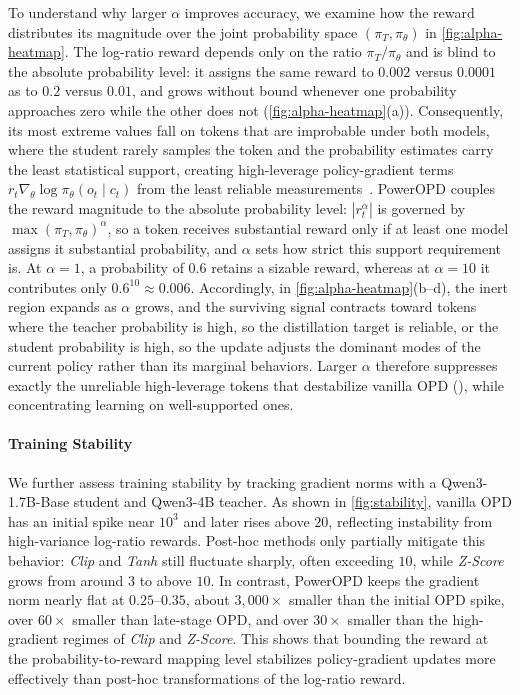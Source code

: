 To understand why larger $\alpha$ improves accuracy, we examine how the reward distributes its magnitude over the joint probability space $(\pi_T, \pi_\theta)$ in \autoref{fig:alpha-heatmap}. The log-ratio reward depends only on the ratio $\pi_T/\pi_\theta$ and is blind to the absolute probability level: it assigns the same reward to $0.002$ versus $0.0001$ as to $0.2$ versus $0.01$, and grows without bound whenever one probability approaches zero while the other does not (\autoref{fig:alpha-heatmap}(a)). Consequently, its most extreme values fall on tokens that are improbable under both models, where the student rarely samples the token and the probability estimates carry the least statistical support, creating high-leverage policy-gradient terms $r_t \nabla_\theta \log \pi_\theta(o_t \mid c_t)$ from the least reliable measurements~\citep{williams1992reinforce, greensmith2004variance}. PowerOPD couples the reward magnitude to the absolute probability level: $|r_t^{\alpha}|$ is governed by $\max(\pi_T, \pi_\theta)^{\alpha}$, so a token receives substantial reward only if at least one model assigns it substantial probability, and $\alpha$ sets how strict this support requirement is. At $\alpha{=}1$, a probability of $0.6$ retains a sizable reward, whereas at $\alpha{=}10$ it contributes only $0.6^{10} \approx 0.006$. Accordingly, in \autoref{fig:alpha-heatmap}(b--d), the inert region expands as $\alpha$ grows, and the surviving signal contracts toward tokens where the teacher probability is high, so the distillation target is reliable, or the student probability is high, so the update adjusts the dominant modes of the current policy rather than its marginal behaviors. Larger $\alpha$ therefore suppresses exactly the unreliable high-leverage tokens that destabilize vanilla OPD (), while concentrating learning on well-supported ones.

\paragraph{Training Stability}
\label{subsec:training-stability}

We further assess training stability by tracking gradient norms with a Qwen3-1.7B-Base student and Qwen3-4B teacher. As shown in \autoref{fig:stability}, vanilla OPD has an initial spike near \(10^3\) and later rises above \(20\), reflecting instability from high-variance log-ratio rewards. Post-hoc methods only partially mitigate this behavior: \emph{Clip} and \emph{Tanh} still fluctuate sharply, often exceeding \(10\), while \emph{Z-Score} grows from around \(3\) to above \(10\). In contrast, PowerOPD keeps the gradient norm nearly flat at \(0.25\)--\(0.35\), about \(3{,}000\times\) smaller than the initial OPD spike, over \(60\times\) smaller than late-stage OPD, and over \(30\times\) smaller than the high-gradient regimes of \emph{Clip} and \emph{Z-Score}. This shows that bounding the reward at the probability-to-reward mapping level stabilizes policy-gradient updates more effectively than post-hoc transformations of the log-ratio reward.